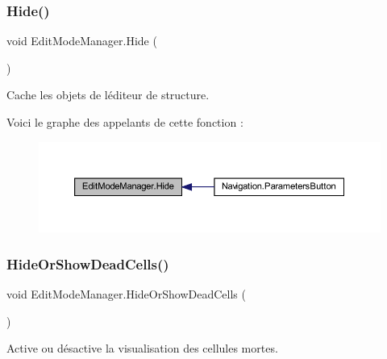\subsubsection{\texorpdfstring{Hide()}{Hide()}}
{\footnotesize\ttfamily void Edit\+Mode\+Manager.\+Hide (\begin{DoxyParamCaption}{ }\end{DoxyParamCaption})\hspace{0.3cm}{\ttfamily [inline]}}



Cache les objets de l\textquotesingle{}éditeur de structure. 

Voici le graphe des appelants de cette fonction \+:
\nopagebreak
\begin{figure}[H]
\begin{center}
\leavevmode
\includegraphics[width=350pt]{class_edit_mode_manager_aacc30d9cdb3d747fbad20130903ec24e_icgraph}
\end{center}
\end{figure}
\mbox{\label{class_edit_mode_manager_ad64498838abd29826c929cad104924be}} 
\subsubsection{\texorpdfstring{Hide\+Or\+Show\+Dead\+Cells()}{HideOrShowDeadCells()}}
{\footnotesize\ttfamily void Edit\+Mode\+Manager.\+Hide\+Or\+Show\+Dead\+Cells (\begin{DoxyParamCaption}{ }\end{DoxyParamCaption})\hspace{0.3cm}{\ttfamily [inline]}}



Active ou désactive la visualisation des cellules mortes. 

\mbox{\label{class_edit_mode_manager_a8a950f58c809a7161d85e5d9a73e4d15}} 
